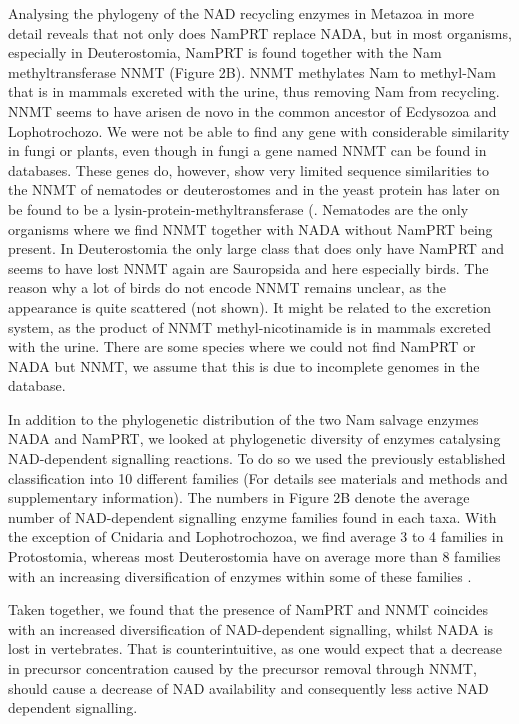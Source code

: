Analysing the phylogeny of the NAD recycling enzymes in Metazoa in more detail reveals that not only does NamPRT replace NADA, but in most organisms, especially in Deuterostomia, NamPRT is found together with the Nam methyltransferase NNMT (Figure 2B). NNMT methylates Nam to methyl-Nam that is in mammals excreted with the urine, thus removing Nam from recycling. NNMT seems to have arisen de novo in the common ancestor of Ecdysozoa and Lophotrochozo.  We were not be able to find any gene with considerable similarity in fungi or plants, even though in fungi a gene named NNMT can be found in databases. These genes do, however, show very limited sequence similarities to the NNMT of nematodes or deuterostomes and in the yeast protein has later on be found to be a lysin-protein-methyltransferase (. Nematodes are the only organisms where we find NNMT together with NADA without NamPRT being present. In Deuterostomia the only large class that does only have NamPRT and seems to have lost NNMT again are Sauropsida and here especially birds. The reason why a lot of birds do not encode NNMT remains unclear, as the appearance is quite scattered (not shown). It might be related to the excretion system, as the product of NNMT methyl-nicotinamide is in mammals excreted with the urine. There are some species where we could not find NamPRT or NADA but NNMT, we assume that this is due to incomplete genomes in the database.

In addition to the phylogenetic distribution of the two Nam salvage enzymes NADA and NamPRT, we looked at phylogenetic diversity of enzymes catalysing NAD-dependent signalling reactions. To do so we used the previously established classification into 10 different families \cite{Gossmann2012} (For details see materials and methods and supplementary information). The numbers in Figure 2B denote the average number of NAD-dependent signalling enzyme families found in each taxa. With the exception of Cnidaria and Lophotrochozoa, we find average 3 to 4 families in Protostomia, whereas most Deuterostomia have on average more than 8 families with an increasing diversification of enzymes within some of these families \cite{Gossmann2014}.

Taken together, we found that the presence of NamPRT and NNMT coincides with an increased diversification of NAD-dependent signalling, whilst NADA is lost in vertebrates. That is  counterintuitive, as one would expect that a decrease in precursor concentration caused by the precursor removal through NNMT, should cause a decrease of NAD availability and consequently less active NAD dependent signalling.



